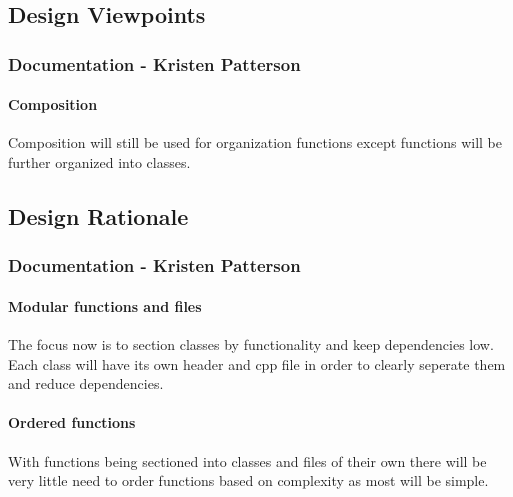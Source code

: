 \documentclass[10pt,letterpaper,onecolumn,draftclsnofoot]{IEEEtran}
\begin{document}
\subsection{Design Viewpoints}
\subsubsection{Documentation - Kristen Patterson}
\paragraph{Composition}
Composition will still be used for organization functions except functions will be further organized into classes.

\subsection{Design Rationale}
\subsubsection{Documentation - Kristen Patterson}
\paragraph{Modular functions and files}
The focus now is to section classes by functionality and keep dependencies low. Each class will have its own header and cpp file in order to clearly seperate them and reduce dependencies.
\paragraph{Ordered functions}
With functions being sectioned into classes and files of their own there will be very little need to order functions based on complexity as most will be simple.
\end{document}
